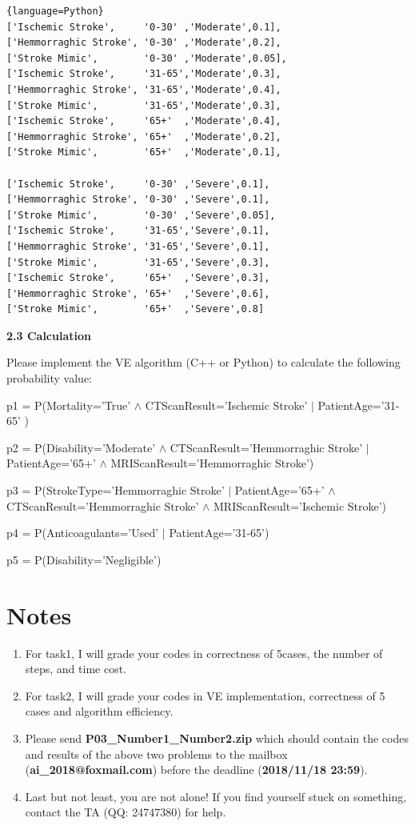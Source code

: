 ﻿\documentclass[a4paper, 11pt]{article}
\begin{document}
\begin{lstlisting}{language=Python}
['Ischemic Stroke',     '0-30' ,'Moderate',0.1],
['Hemmorraghic Stroke', '0-30' ,'Moderate',0.2],
['Stroke Mimic',        '0-30' ,'Moderate',0.05],
['Ischemic Stroke',     '31-65','Moderate',0.3],
['Hemmorraghic Stroke', '31-65','Moderate',0.4],
['Stroke Mimic',        '31-65','Moderate',0.3],
['Ischemic Stroke',     '65+'  ,'Moderate',0.4],
['Hemmorraghic Stroke', '65+'  ,'Moderate',0.2],
['Stroke Mimic',        '65+'  ,'Moderate',0.1],

['Ischemic Stroke',     '0-30' ,'Severe',0.1],
['Hemmorraghic Stroke', '0-30' ,'Severe',0.1],
['Stroke Mimic',        '0-30' ,'Severe',0.05],
['Ischemic Stroke',     '31-65','Severe',0.1],
['Hemmorraghic Stroke', '31-65','Severe',0.1],
['Stroke Mimic',        '31-65','Severe',0.3],
['Ischemic Stroke',     '65+'  ,'Severe',0.3],
['Hemmorraghic Stroke', '65+'  ,'Severe',0.6],
['Stroke Mimic',        '65+'  ,'Severe',0.8]
\end{lstlisting}
\textbf{2.3 Calculation}

Please implement the VE algorithm (C++ or Python) to calculate the following probability value:

p1 = P(Mortality='True' $\land$ CTScanResult='Ischemic Stroke' $|$ PatientAge='31-65' )

p2 = P(Disability='Moderate' $\land$ CTScanResult='Hemmorraghic Stroke' $|$ PatientAge='65+' $\land$  MRIScanResult='Hemmorraghic Stroke')

p3 = P(StrokeType='Hemmorraghic Stroke' $|$ PatientAge='65+' $\land$ CTScanResult='Hemmorraghic Stroke' $\land$ MRIScanResult='Ischemic Stroke')

p4 = P(Anticoagulants='Used' $|$ PatientAge='31-65')

p5 = P(Disability='Negligible')




\section{Notes}

\begin{enumerate}
\item For task1, I will grade your codes in correctness of 5cases, the number of steps, and time cost.

\item For task2, I will grade your codes in VE implementation, correctness of 5 cases and algorithm efficiency.

\item Please send \textbf{P03\_Number1\_Number2.zip} which should contain the codes and results of the above two problems to the mailbox (\textbf{ai\_2018@foxmail.com}) before the deadline (\textbf{2018/11/18 23:59}). 
\item Last but not least, you are not alone! If you find yourself stuck on something, contact the TA (QQ: 24747380) for help.
\end{enumerate}



%
%
\end{document}
